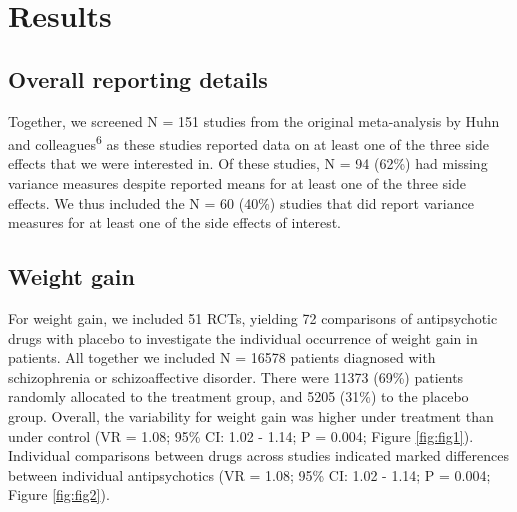 \documentclass[9pt,english,,jou,floatsintext]{apa6}
\begin{document}
\section{Results}\label{results}

\subsection{Overall reporting details}\label{overall-reporting-details}

Together, we screened N = 151 studies from the original meta-analysis by
Huhn and colleagues\textsuperscript{6} as these studies reported data on
at least one of the three side effects that we were interested in. Of
these studies, N = 94 (62\%) had missing variance measures despite
reported means for at least one of the three side effects. We thus
included the N = 60 (40\%) studies that did report variance measures for
at least one of the side effects of interest.

\subsection{Weight gain}\label{weight-gain}

For weight gain, we included 51 RCTs, yielding 72 comparisons of
antipsychotic drugs with placebo to investigate the individual
occurrence of weight gain in patients. All together we included N =
16578 patients diagnosed with schizophrenia or schizoaffective disorder.
There were 11373 (69\%) patients randomly allocated to the treatment
group, and 5205 (31\%) to the placebo group. Overall, the variability
for weight gain was higher under treatment than under control (VR =
1.08; 95\% CI: 1.02 - 1.14; P = 0.004; Figure \ref{fig:fig1}).
Individual comparisons between drugs across studies indicated marked
differences between individual antipsychotics (VR = 1.08; 95\% CI: 1.02
- 1.14; P = 0.004; Figure \ref{fig:fig2}).
\end{document}
